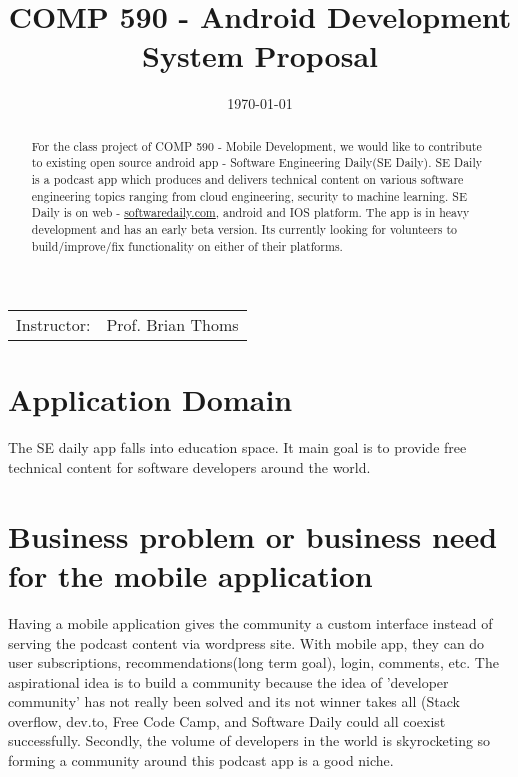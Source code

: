 \documentclass{article}
\title{COMP 590 - Android Development \\ System Proposal} %
\author{\hmwkAuthorName} %
\date{\today} %
\begin{document}
\maketitle %

\begin{center}
\begin{tabular}{l r}
Instructor: & Prof. Brian Thoms%
\end{tabular}
\end{center}

\begin{abstract}
  For the class project of COMP 590 - Mobile Development, we would like to contribute to existing open source android app - Software Engineering Daily(SE Daily). SE Daily is a podcast app which produces and delivers technical content on various software engineering topics ranging from cloud engineering, security to machine learning. SE Daily is on web - \href{https://www.softwaredaily.com}{softwaredaily.com}, android and IOS platform. The app is in heavy development and has an early beta version. Its currently looking for volunteers to build/improve/fix functionality on either of their platforms.
\end{abstract}

\section{Application Domain}
The SE daily app falls into education space. It main goal is to provide free technical content for software developers around the world.


\section{Business problem or business need for the mobile application}
Having a mobile application gives the community a custom interface instead of serving the podcast content via wordpress site. With mobile app, they can do user subscriptions, recommendations(long term goal), login, comments, etc. The aspirational idea is to build a community because the idea of 'developer community' has not really been solved and its not winner takes all (Stack overflow, dev.to, Free Code Camp, and Software Daily could all coexist successfully. Secondly, the volume of developers in the world is skyrocketing so forming a community around this podcast app is a good niche.
\end{document}
